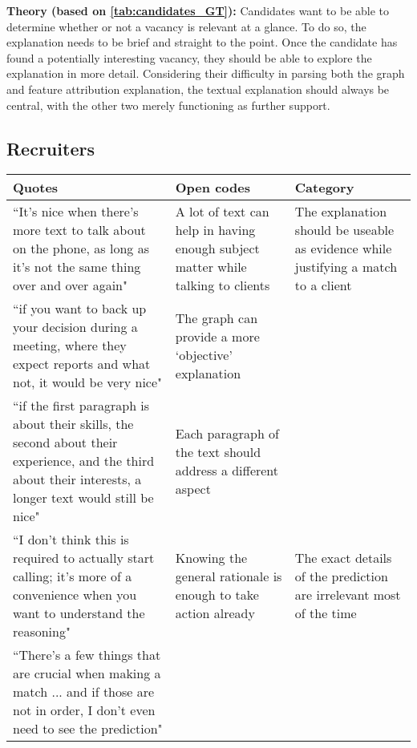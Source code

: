 \noindent \textbf{Theory (based on \cref{tab:candidates_GT}):} Candidates want to be able to determine whether or not a vacancy is relevant at a glance. To do so, the explanation needs to be brief and straight to the point. Once the candidate has found a potentially interesting vacancy, they should be able to explore the explanation in more detail. Considering their difficulty in parsing both the graph and feature attribution explanation, the textual explanation should always be central, with the other two merely functioning as further support. 

\newpage

\subsection{Recruiters}
\begin{table*}[]
\captionsetup{width=1.5\textwidth}
\footnotesize
\begin{adjustwidth}{-2.5in}{-2.5in}
\centering
\begin{tabularx}{1.5\textwidth}{@{}X>{\raggedright\arraybackslash}p{6.5cm}>{\raggedright\arraybackslash}p{3.5cm}@{}}
\toprule
\textbf{Quotes} &
  \textbf{Open codes} &
  \textbf{Category} \\ \midrule
``It's nice when there's more text to talk about on the phone, as long as it's not the same thing over and over again" &
  A lot of text can help in having enough subject matter while talking to clients &
  The explanation should be useable as evidence while justifying a match to a client \\ \cmidrule(r){1-1}
``if you want to back up your decision during a meeting, where they expect reports and what not, it would be very nice" &
  The graph can provide a more `objective' explanation &
   \\ \cmidrule(r){1-1}
``if the first paragraph is about their skills, the second about their experience, and the third about their interests, a longer text would still be nice" &
  Each paragraph of the text should address a different aspect &
   \\ \midrule
``I don't think this is required to actually start calling; it's more of a convenience when you want to understand the reasoning" &
  Knowing the general rationale is enough to take action already &
  The exact details of the prediction are irrelevant most of the time \\ \cmidrule(r){1-1}
``There's a few things that are crucial when making a match ... and if those are not in order, I don't even need to see the prediction" &

\end{tabularx}
\end{adjustwidth}
\end{table*}
